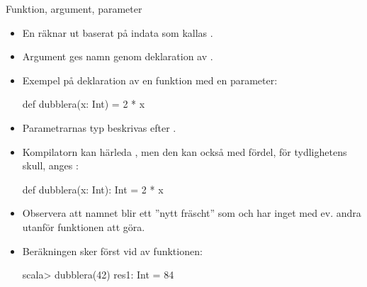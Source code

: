 \begin{Slide}{Funktion, argument, parameter}\SlideFontSmall
\begin{itemize}
\item En  räknar ut  baserat på indata som kallas .

\item Argument ges namn genom deklaration av .

\item Exempel på deklaration av en funktion med en parameter:
\begin{Code}
def dubblera(x: Int) = 2 * x
\end{Code}

\item Parametrarnas typ  beskrivas efter .
\item Kompilatorn kan härleda , men den kan också med fördel, för tydlighetens skull, anges :
\begin{Code}
def dubblera(x: Int): Int = 2 * x
\end{Code}

\item Observera att namnet  blir ett ''nytt fräscht''  som  och har inget med ev. andra  utanför funktionen att göra.

\item Beräkningen sker först vid  av funktionen:
\begin{REPL}
scala> dubblera(42)
res1: Int = 84
\end{REPL}

\end{itemize}
\end{Slide}






